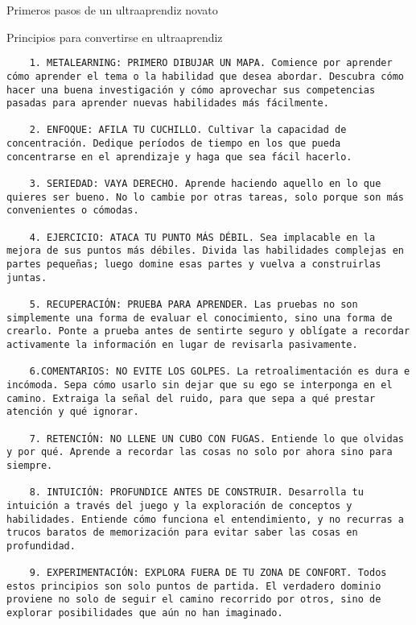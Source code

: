 Primeros pasos de un ultraaprendiz novato


Principios para convertirse en ultraaprendiz



\begin{verbatim}
	1. METALEARNING: PRIMERO DIBUJAR UN MAPA. Comience por aprender cómo aprender el tema o la habilidad que desea abordar. Descubra cómo hacer una buena investigación y cómo aprovechar sus competencias pasadas para aprender nuevas habilidades más fácilmente.
	
	2. ENFOQUE: AFILA TU CUCHILLO. Cultivar la capacidad de concentración. Dedique períodos de tiempo en los que pueda concentrarse en el aprendizaje y haga que sea fácil hacerlo.
	
	3. SERIEDAD: VAYA DERECHO. Aprende haciendo aquello en lo que quieres ser bueno. No lo cambie por otras tareas, solo porque son más convenientes o cómodas.
	
	4. EJERCICIO: ATACA TU PUNTO MÁS DÉBIL. Sea implacable en la mejora de sus puntos más débiles. Divida las habilidades complejas en partes pequeñas; luego domine esas partes y vuelva a construirlas juntas.
	
	5. RECUPERACIÓN: PRUEBA PARA APRENDER. Las pruebas no son simplemente una forma de evaluar el conocimiento, sino una forma de crearlo. Ponte a prueba antes de sentirte seguro y oblígate a recordar activamente la información en lugar de revisarla pasivamente.
	
	6.COMENTARIOS: NO EVITE LOS GOLPES. La retroalimentación es dura e incómoda. Sepa cómo usarlo sin dejar que su ego se interponga en el camino. Extraiga la señal del ruido, para que sepa a qué prestar atención y qué ignorar.
	
	7. RETENCIÓN: NO LLENE UN CUBO CON FUGAS. Entiende lo que olvidas y por qué. Aprende a recordar las cosas no solo por ahora sino para siempre.
	
	8. INTUICIÓN: PROFUNDICE ANTES DE CONSTRUIR. Desarrolla tu intuición a través del juego y la exploración de conceptos y habilidades. Entiende cómo funciona el entendimiento, y no recurras a trucos baratos de memorización para evitar saber las cosas en profundidad.
	
	9. EXPERIMENTACIÓN: EXPLORA FUERA DE TU ZONA DE CONFORT. Todos estos principios son solo puntos de partida. El verdadero dominio proviene no solo de seguir el camino recorrido por otros, sino de explorar posibilidades que aún no han imaginado.
\end{verbatim}


